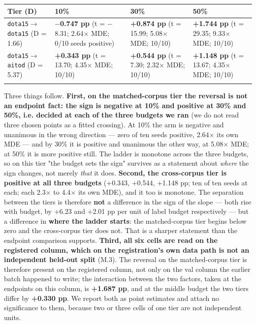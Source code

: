 \documentclass[pdflatex,sn-mathphys-ay]{sn-jnl}
\begin{document}
{\footnotesize
\setlength{\tabcolsep}{4pt}
\begin{longtable}{p{}p{}p{}p{}}
\toprule
Tier (D) & 10\% & 30\% & 50\% \\
\midrule
\endhead
\texttt{dota15\ensuremath{\rightarrow}dota15} (D = 1.66) & \textbf{\ensuremath{-}0.747 pp} (t = \ensuremath{-}8.31; 2.64\ensuremath{\times} MDE; 0/10 seeds positive) & \textbf{+0.874 pp} (t = 15.99; 5.08\ensuremath{\times} MDE; 10/10) & \textbf{+1.744 pp} (t = 29.35; 9.33\ensuremath{\times} MDE; 10/10) \\
\texttt{dota15\ensuremath{\rightarrow}aitod} (D = 5.37) & \textbf{+0.343 pp} (t = 13.70; 4.35\ensuremath{\times} MDE; 10/10) & \textbf{+0.544 pp} (t = 7.30; 2.32\ensuremath{\times} MDE; 10/10) & \textbf{+1.148 pp} (t = 13.67; 4.35\ensuremath{\times} MDE; 10/10) \\
\botrule
\end{longtable}}

Three things follow. \textbf{First, on the matched-corpus tier the reversal is not an endpoint fact: the sign is negative at 10\% and positive at 30\% and 50\%, i.e. decided at each of the three budgets we ran} (we do not read three chosen points as a fitted crossing). At 10\% the arm is negative and unanimous in the wrong direction --- zero of ten seeds positive, 2.64\ensuremath{\times} its own MDE --- and by 30\% it is positive and unanimous the other way, at 5.08\ensuremath{\times} MDE; at 50\% it is more positive still. The ladder is monotone across the three budgets, so on this tier "the budget sets the sign" survives as a statement about \emph{where} the sign changes, not merely \emph{that} it does. \textbf{Second, the cross-corpus tier is positive at all three budgets} (+0.343, +0.544, +1.148 pp; ten of ten seeds at each; each 2.3\ensuremath{\times} to 4.4\ensuremath{\times} its own MDE), and it too is monotone. The separation between the tiers is therefore \textbf{not} a difference in the sign of the slope --- both rise with budget, by +6.23 and +2.01 pp per unit of label budget respectively --- but a difference in \textbf{where the ladder starts}: the matched-corpus tier begins below zero and the cross-corpus tier does not. That is a sharper statement than the endpoint comparison supports. \textbf{Third, all six cells are read on the registered column, which on the registration's own data path is not an independent held-out split} (M.3). The reversal on the matched-corpus tier is therefore present on the registered column, not only on the val column the earlier batch happened to write; the interaction between the two factors, taken at the endpoints on this column, is \textbf{+1.687 pp}, and at the middle budget the two tiers differ by \textbf{+0.330 pp}. We report both as point estimates and attach no significance to them, because two or three cells of one tier are not independent units.
\end{document}
